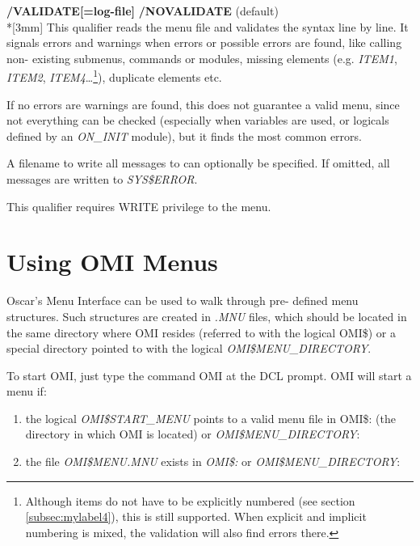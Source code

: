 \documentclass[a4paper]{book}
\newcommand{\vs}{\vspace{3mm}}
\renewcommand{\indent}{\hspace*{5mm}}
\begin{document}
\vs

\indent\textbf{/VALIDATE[=log-file]} \newline
\indent\textbf{/NOVALIDATE} (default)\\*[3mm]
This qualifier reads the menu file and validates the syntax line by line. It 
signals errors and warnings when errors or possible errors are found, like 
calling non- existing submenus, commands or modules, missing elements (e.g. 
\textsl{ITEM1}, \textsl{ITEM2}, \textsl{ITEM4}\ldots\footnote{ Although items do not
have to be explicitly numbered (see section \ref{subsec:mylabel4}), this is still supported.
When explicit and implicit numbering is mixed, the validation will also find errors there.}), duplicate elements etc.

\vs

If no errors are warnings are found, this does not guarantee a valid menu, 
since not everything can be checked (especially when variables are used, or 
logicals defined by an \textsl{ON{\_}INIT} module), but it finds the most common 
errors.

\vs

A filename to write all messages to can optionally be specified. If omitted, 
all messages are written to \textsl{SYS{\$}ERROR}.

\vs

This qualifier requires WRITE privilege to the menu.

\chapter{Using OMI Menus}
\label{sec:using}

Oscar's Menu Interface can be used to walk through pre- defined menu 
structures. Such structures are created in \textsl{.MNU} files, which should be 
located in the same directory where OMI resides (referred to with the 
logical OMI{\$}) or a special directory pointed to with the logical 
\textsl{OMI{\$}MENU{\_}DIRECTORY}.

To start OMI, just type the command OMI at the DCL prompt. OMI will start a 
menu if:
\begin{enumerate}
\item the logical \textsl{OMI{\$}START{\_}MENU} points to a valid menu file in 
OMI{\$}: (the directory in which OMI is located)
or \textsl{OMI{\$}MENU{\_}DIRECTORY}:

\item the file \textsl{OMI{\$}MENU.MNU} exists in \textsl{OMI{\$}:} or
\textsl{OMI{\$}MENU{\_}DIRECTORY}:
\end{enumerate}
\end{document}
